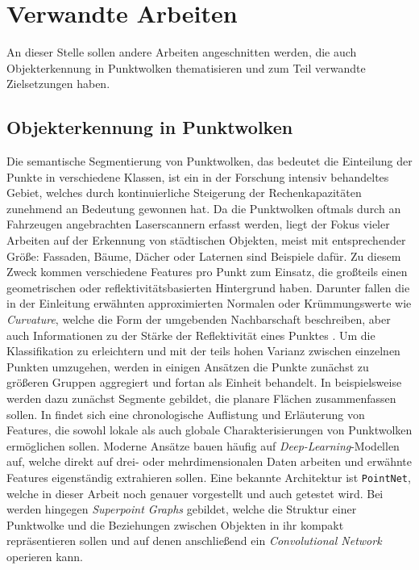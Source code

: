 
\chapter{Verwandte Arbeiten}
\label{chap:rel-work}

An dieser Stelle sollen andere Arbeiten angeschnitten werden, die auch Objekterkennung in Punktwolken thematisieren und zum Teil verwandte Zielsetzungen haben.

\section{Objekterkennung in Punktwolken}

Die semantische Segmentierung von Punktwolken, das bedeutet die Einteilung der Punkte in verschiedene Klassen, ist ein in der Forschung intensiv behandeltes Gebiet, welches durch kontinuierliche Steigerung der Rechenkapazitäten zunehmend an Bedeutung gewonnen hat. Da die Punktwolken oftmals durch an Fahrzeugen angebrachten Laserscannern erfasst werden, liegt der Fokus vieler Arbeiten auf der Erkennung von städtischen Objekten, meist mit entsprechender Größe: Fassaden, Bäume, Dächer oder Laternen sind Beispiele dafür. Zu diesem Zweck kommen verschiedene Features pro Punkt zum Einsatz, die großteils einen geometrischen oder reflektivitätsbasierten Hintergrund haben. Darunter fallen die in der Einleitung erwähnten approximierten Normalen oder Krümmungswerte wie \textit{Curvature}, welche die Form der umgebenden Nachbarschaft beschreiben, aber auch Informationen zu der Stärke der Reflektivität eines Punktes \citep{Thomas.etal-2018, Zaboli.etal-2019}. Um die Klassifikation zu erleichtern und mit der teils hohen Varianz zwischen einzelnen Punkten umzugehen, werden in einigen Ansätzen die Punkte zunächst zu größeren Gruppen aggregiert und fortan als Einheit behandelt. In \cite{Vosselman-2013} beispielsweise werden dazu zunächst Segmente gebildet, die planare Flächen zusammenfassen sollen. In \cite{Han.etal-2018} findet sich eine chronologische Auflistung und Erläuterung von Features, die sowohl lokale als auch globale Charakterisierungen von Punktwolken ermöglichen sollen. Moderne Ansätze bauen häufig auf \textit{Deep-Learning}-Modellen auf, welche direkt auf drei- oder mehrdimensionalen Daten arbeiten und erwähnte Features eigenständig extrahieren sollen. Eine bekannte Architektur ist \texttt{PointNet}\cite{Charles.etal-2017}, welche in dieser Arbeit noch genauer vorgestellt und auch getestet wird. Bei \cite{Landrieu.Simonovsky-2018} werden hingegen \textit{Superpoint Graphs} gebildet, welche die Struktur einer Punktwolke und die Beziehungen zwischen Objekten in ihr kompakt repräsentieren sollen und auf denen anschließend ein \textit{Convolutional Network} operieren kann.

